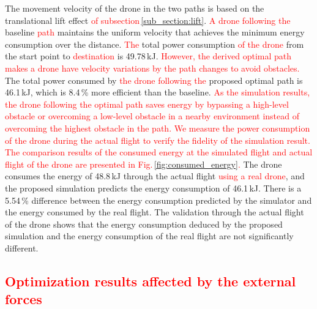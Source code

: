 \documentclass[journal]{./template/IEEEtran}
\begin{document}
\noindent The movement velocity of the drone in the two paths is based on the translational lift effect \textcolor{red}{of subsection\,\ref{sub_section:lift}}.
\textcolor{red}{A drone following the} baseline \textcolor{red}{path} maintains the uniform velocity that achieves the minimum energy consumption over the distance. 
\textcolor{red}{The} total power consumption \textcolor{red}{of the drone} from the start point to \textcolor{red}{destination} is 49.78\,kJ.
\textcolor{red}{However, the derived optimal path makes a drone have velocity variations by the path changes to avoid obstacles.} 
The total power consumed by \textcolor{red}{the drone following the} proposed optimal path is 46.1\,kJ, which is 8.4\,\% more efficient than the baseline. 
\textcolor{red}{As the simulation results, the drone following the optimal path saves energy by bypassing a high-level obstacle or overcoming a low-level obstacle in a nearby environment instead of overcoming the highest obstacle in the path.
We measure the power consumption of the drone during the actual flight to verify the fidelity of the simulation result.
The comparison results of the consumed energy at the simulated flight and actual flight of the drone are presented in Fig.\,\ref{fig:consumed_energy}.}
The drone consumes the energy of 48.8\,kJ through the actual flight \textcolor{red}{using a real drone}, and the proposed simulation predicts the energy consumption of 46.1\,kJ.
There is a 5.54\,\% difference between the energy consumption predicted by the simulator and the energy consumed by the real flight.
The validation through the actual flight of the drone shows that the energy consumption deduced by the proposed simulation and the energy consumption of the real flight are not significantly different.



\subsection{\textcolor{red}{Optimization results affected by the external forces}}
\end{document}

